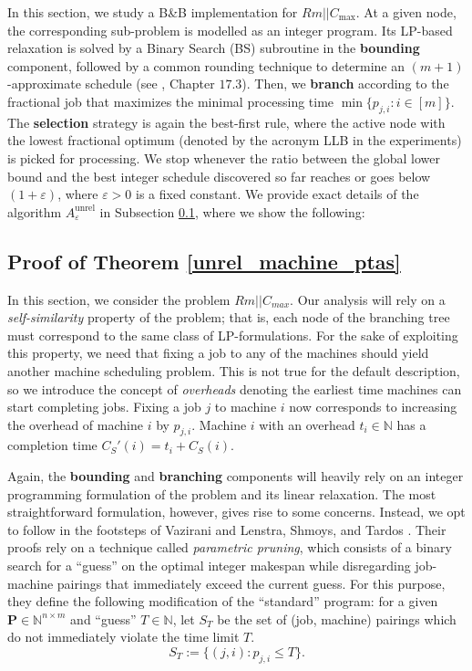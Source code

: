 \documentclass[moor,sglanonrev]{informs4}
\theoremstyle{plain}
\begin{document}
In this section, we study a B\&B implementation for $Rm || C_{\max}$. At a given node, the corresponding sub-problem is modelled as an integer program. Its LP-based relaxation is solved by a Binary Search (BS) subroutine in the \textbf{bounding} component, followed by a common rounding technique to determine an $(m+1)$-approximate schedule (see \cite{vazirani}, Chapter $17.3$). Then, we \textbf{branch} according to the fractional job that maximizes the minimal processing time $\min \{p_{j, i}: i \in [m]\}$. The \textbf{selection} strategy is again the best-first rule, where the active node with the lowest fractional optimum (denoted by the acronym LLB in the experiments) is picked for processing. We stop whenever the ratio between the global lower bound and the best integer schedule discovered so far reaches or goes below $(1+\varepsilon)$, where $\varepsilon>0$ is a fixed constant. We provide exact details of the algorithm $A^{\text{unrel}}_{\varepsilon}$ in Subsection \ref{sec:js_ptas_proof}, where we show the following:

\unrel


\subsection{Proof of Theorem \ref{unrel_machine_ptas}}\label{sec:js_ptas_proof}

In this section, we consider the problem $Rm||C_{max}$. Our analysis will rely on a \emph{self-similarity} property of the problem; that is, each node of the branching tree must correspond to the same class of LP-formulations. For the sake of exploiting this property, we need that fixing a job to any of the machines should yield another machine scheduling problem. This is not true for the default description, so we introduce the concept of \emph{overheads} denoting the earliest time machines can start completing jobs. Fixing a job $j$ to machine $i$ now corresponds to increasing the overhead of machine $i$ by $p_{j, i}$. Machine $i$ with an overhead $t_i \in \mathbb{N}$ has a completion time $C_S'(i)= t_i + C_S(i)$.

Again, the \textbf{bounding} and \textbf{branching} components will heavily rely on an integer programming formulation of the problem and its linear relaxation. The most straightforward formulation, however, gives rise to some concerns. Instead, we opt to follow in the footsteps of Vazirani \cite{vazirani} and Lenstra, Shmoys, and Tardos \cite{lenstra_shmoys_tardos}. Their proofs rely on a technique called \emph{parametric pruning}, which consists of a binary search for a ``guess'' on the optimal integer makespan while disregarding job-machine pairings that immediately exceed the current guess. For this purpose, they define the following modification of the ``standard'' program: for a given $\bm{P} \in \mathbb{N}^{n\times m}$ and ``guess'' $T \in \mathbb{N}$, let $S_T$ be the set of (job, machine) pairings which do not immediately violate the time limit $T$.
\[
S_T := \{(j,i): p_{j,i} \le T\}.
\]
\end{document}
